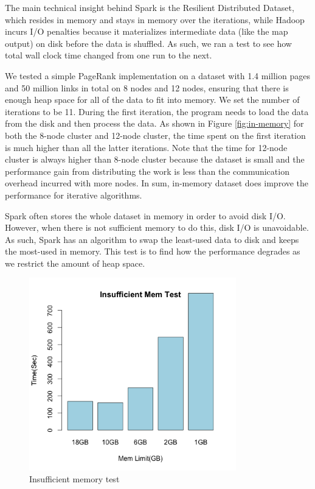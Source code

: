 \documentclass{article}
\begin{document}
The main technical insight behind Spark is the Resilient Distributed Dataset,
which resides in memory and stays in memory over the iterations, while Hadoop
incurs I/O penalties because it materializes intermediate data (like the map
output) on disk before the data is shuffled. As such, we ran a test to see
how total wall clock time changed from one run to the next.

We tested a simple PageRank implementation on a dataset with 1.4 million pages
and 50 million links in total on 8 nodes and 12 nodes, ensuring that there
is enough heap space for all of the data to fit into memory. We set
the number of iterations to be 11. During the first iteration, the program
needs to load the data from the disk and then process the data. As shown in
Figure \ref{fig:in-memory} for both the 8-node cluster and 12-node cluster, the
time spent on the first iteration is much higher than all the latter
iterations. Note that the time for 12-node cluster is always
higher than 8-node cluster because the dataset is small and the performance
gain from distributing the work is less than the communication overhead
incurred with more nodes. In sum, in-memory dataset does improve the
performance for iterative algorithms.

Spark often stores the whole dataset in memory in order to avoid disk I/O.
However, when there is not sufficient memory to do this, disk I/O is
unavoidable.  As such, Spark has an algorithm to swap the least-used
data to disk and keeps the most-used in memory. This test is to find how
the performance degrades as we restrict the amount of heap space.


\begin{figure}[H]
        \centering
        \includegraphics[width=90mm]{images/insufficient_memory.png}
        \caption{Insufficient memory test}
        \label{fig:insuff-mem}
    \end{figure}
\end{document}
